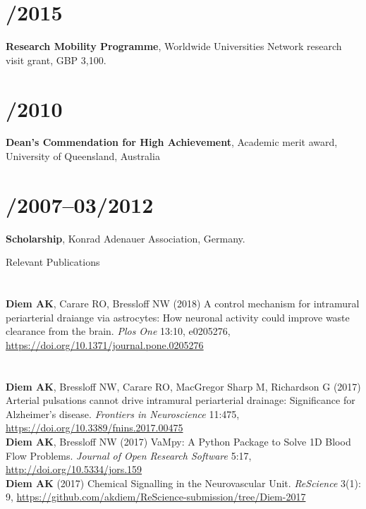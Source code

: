 \documentclass[margin,line,10pt]{res}
\begin{document}
\begin{resume}
\section{/2015}{\bf Research Mobility Programme}, Worldwide Universities Network research visit grant, GBP 3,100.\\
\vspace*{-.35in}
\section{/2010}{\bf Dean's Commendation for High Achievement}, Academic merit award, University of Queensland, Australia\\
\vspace*{-.35in}
\section{/2007--03/2012}{\bf Scholarship}, Konrad Adenauer Association, Germany.\\

\vspace*{-.2in}

{\sc Relevant Publications}\\
\vspace*{-.35in}
\section{}
{\bf Diem AK}, Carare RO, Bressloff NW (2018) A control mechanism for intramural periarterial draiange via astrocytes: How neuronal activity could improve waste clearance from the brain. \textit{Plos One} 13:10, e0205276, \url{https://doi.org/10.1371/journal.pone.0205276}\\
\vspace*{-.35in}
\section{}
{\bf Diem AK}, Bressloff NW, Carare RO, MacGregor Sharp M, Richardson G (2017) Arterial pulsations cannot drive intramural periarterial drainage: Significance for Alzheimer's disease. \textit{Frontiers in Neuroscience} 11:475, \url{https://doi.org/10.3389/fnins.2017.00475}\\
{\bf Diem AK}, Bressloff NW (2017) VaMpy: A Python Package to Solve 1D Blood Flow Problems. {\em Journal of Open Research Software} 5:17, \url{http://doi.org/10.5334/jors.159}\\
{\bf Diem AK} (2017) Chemical Signalling in the Neurovascular Unit. \textit{ReScience} 3(1): 9, \url{https://github.com/akdiem/ReScience-submission/tree/Diem-2017}\\
\vspace*{-.35in}

\end{resume}
\end{document}

